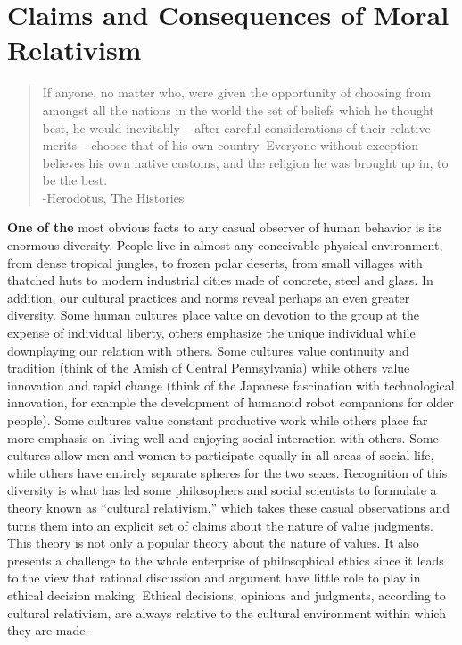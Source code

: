 \documentclass[]{book}
\begin{document}
\hypertarget{claims-and-consequences-of-moral-relativism}{%
\section{Claims and Consequences of Moral Relativism}\label{claims-and-consequences-of-moral-relativism}}

\begin{quote}
If anyone, no matter who, were given the opportunity of choosing from amongst all the nations in the world the set of beliefs which he thought best, he would inevitably -- after careful considerations of their relative merits -- choose that of his own country. Everyone without exception believes his own native customs, and the religion he was brought up in, to be the best.\\
-Herodotus, The Histories
\end{quote}

\textbf{One of the} most obvious facts to any casual observer of human behavior is its enormous diversity. People live in almost any conceivable physical environment, from dense tropical jungles, to frozen polar deserts, from small villages with thatched huts to modern industrial cities made of concrete, steel and glass. In addition, our cultural practices and norms reveal perhaps an even greater diversity. Some human cultures place value on devotion to the group at the expense of individual liberty, others emphasize the unique individual while downplaying our relation with others. Some cultures value continuity and tradition (think of the Amish of Central Pennsylvania) while others value innovation and rapid change (think of the Japanese fascination with technological innovation, for example the development of humanoid robot companions for older people). Some cultures value constant productive work while others place far more emphasis on living well and enjoying social interaction with others. Some cultures allow men and women to participate equally in all areas of social life, while others have entirely separate spheres for the two sexes. Recognition of this diversity is what has led some philosophers and social scientists to formulate a theory known as ``cultural relativism,'' which takes these casual observations and turns them into an explicit set of claims about the nature of value judgments. This theory is not only a popular theory about the nature of values. It also presents a challenge to the whole enterprise of philosophical ethics since it leads to the view that rational discussion and argument have little role to play in ethical decision making. Ethical decisions, opinions and judgments, according to cultural relativism, are always relative to the cultural environment within which they are made.
\end{document}
